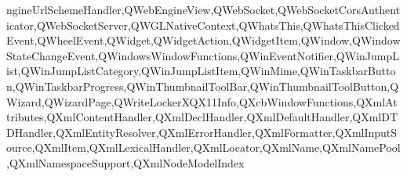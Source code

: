 {{ngineUrlSchemeHandler,QWebEngineView,QWebSocket,QWebSocketCorsAuthenticator,QWebSocketServer,QWGLNativeContext,QWhatsThis,QWhatsThisClickedEvent,QWheelEvent,QWidget,QWidgetAction,QWidgetItem,QWindow,QWindowStateChangeEvent,QWindowsWindowFunctions,QWinEventNotifier,QWinJumpList,QWinJumpListCategory,QWinJumpListItem,QWinMime,QWinTaskbarButton,QWinTaskbarProgress,QWinThumbnailToolBar,QWinThumbnailToolButton,QWizard,QWizardPage,QWriteLockerXQX11Info,QXcbWindowFunctions,QXmlAttributes,QXmlContentHandler,QXmlDeclHandler,QXmlDefaultHandler,QXmlDTDHandler,QXmlEntityResolver,QXmlErrorHandler,QXmlFormatter,QXmlInputSource,QXmlItem,QXmlLexicalHandler,QXmlLocator,QXmlName,QXmlNamePool,QXmlNamespaceSupport,QXmlNodeModelIndex}
}